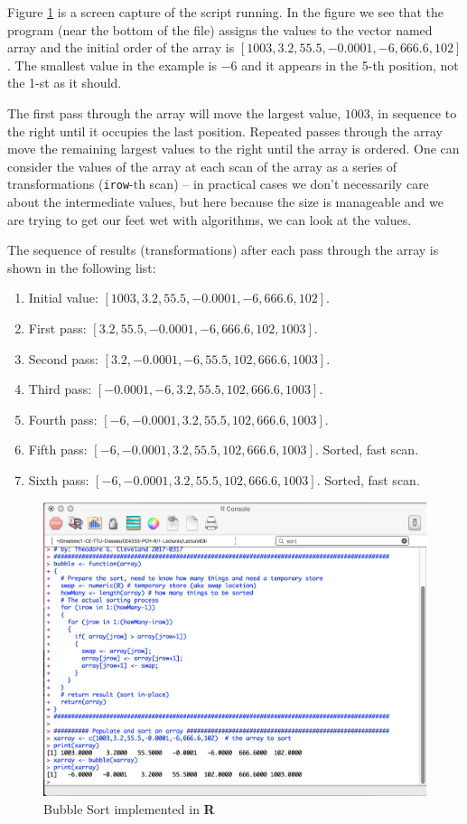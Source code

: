 Figure \ref{fig:MyBubbleSort.jpg} is a screen capture of the script running.   
In the figure we see that the program (near the bottom of the file) assigns the values to the vector named array and the initial order of the array is $[1003,3.2,55.5,-0.0001,-6,666.6,102]$.   
The smallest value in the example is $-6$ and it appears in the 5-th position, not the 1-st as it should.  

The first pass through the array will move the largest value, $1003$, in sequence to the right until it occupies the last position.
Repeated passes through the array move the remaining largest values to the right until the array is ordered.  
One can consider the values of the array at each scan of the array as a series of transformations (\texttt{irow}-th scan) -- in practical cases we don't necessarily care about the intermediate values, but here because the size is manageable and we are trying to get our feet wet with algorithms, we can look at the values.

The sequence of results (transformations) after each pass through the array is shown in the following list:
\begin{enumerate}
\item Initial value: $[1003,3.2,55.5,-0.0001,-6,666.6,102]$.
\item First pass: $[3.2,55.5,-0.0001,-6,666.6,102,1003]$.
\item Second pass: $[3.2,-0.0001,-6,55.5,102,666.6,1003]$.
\item Third pass: $[-0.0001,-6,3.2,55.5,102,666.6,1003]$.
\item Fourth pass: $[-6,-0.0001,3.2,55.5,102,666.6,1003]$.
\item Fifth pass:  $[-6,-0.0001,3.2,55.5,102,666.6,1003]$. Sorted, fast scan.
\item Sixth pass: $[-6,-0.0001,3.2, 55.5,102,666.6,1003]$.  Sorted, fast scan.
\end{enumerate}
\begin{figure}[h!] %
   \centering
   \includegraphics[width=6in]{./2-Algorithms/MyBubbleSort.jpg} 
   \caption{Bubble Sort implemented in \textbf{R}}
   \label{fig:MyBubbleSort.jpg}
\end{figure}

